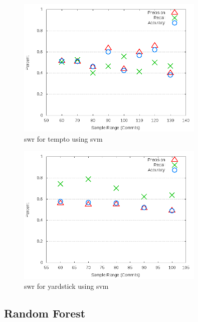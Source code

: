 \clearpage
\begin{figure}[!t]
\centering
\includegraphics[width=0.8\textwidth]{images/svm/test_1/tempto_sample_range.png}
\caption{\gls{swr} for tempto using \gls{svm}}
\label{fig:test_1_tempto_svm}
\end{figure}

\begin{figure}[!t]
\centering
\includegraphics[width=0.8\textwidth]{images/svm/test_1/yardstick_sample_range.png}
\caption{\gls{swr} for yardstick using \gls{svm}}
\label{fig:test_1_yardstick_svm}
\end{figure}


\subsection{Random Forest}
\label{app_sub:experiment_1_rf}

